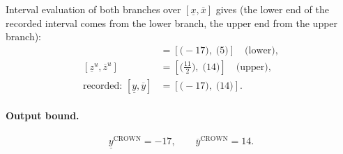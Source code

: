\documentclass[11pt]{article}
\begin{document}
Interval evaluation of both branches over $[\underline{x}, \overline{x}]$ gives (the lower end of the recorded interval comes from the lower branch, the upper end from the upper branch):
\begin{align*}
[\underline{z}^{\ell}, \overline{z}^{\ell}] &= [\bigl(-17\bigr),\; \bigl(5\bigr)] \quad\text{(lower)}, \\
[\underline{z}^{u}, \overline{z}^{u}] &= [\bigl(\frac{11}{2}\bigr),\; \bigl(14\bigr)] \quad\text{(upper)}, \\
\text{recorded: } [\underline{y}, \overline{y}] &= [\bigl(-17\bigr),\; \bigl(14\bigr)].
\end{align*}
\paragraph{Output bound.}
\begin{equation*}
\underline{y}^{\text{CROWN}} = -17, \qquad \overline{y}^{\text{CROWN}} = 14.
\end{equation*}
\end{document}
